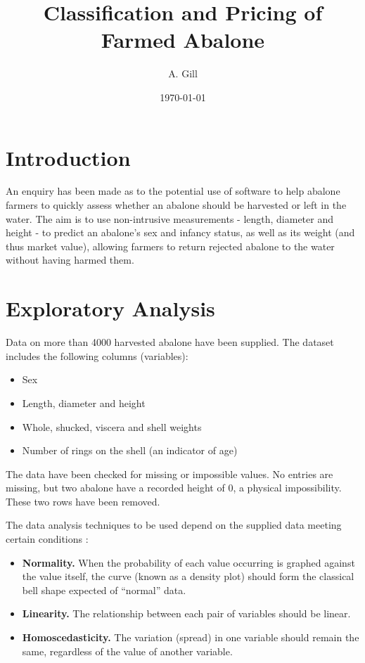 \documentclass[11pt, a4paper]{article}
\title{\Large\bfseries Classification and Pricing of Farmed Abalone}
\author{\large A. Gill}
\date{\small \today}
\begin{document}
    
    \maketitle

    \section*{Introduction}    
      
    An enquiry has been made as to the potential use of software to help abalone farmers to quickly assess whether an abalone should be harvested or left in the water. The aim is to use non-intrusive measurements - length, diameter and height - to predict an abalone's sex and infancy status, as well as its weight (and thus market value), allowing farmers to return rejected abalone to the water without having harmed them.

    \section{Exploratory Analysis}

    Data on more than 4000 harvested abalone have been supplied. The dataset includes the following columns (variables):

    \begin{itemize}
        \item Sex
        \item Length, diameter and height
        \item Whole, shucked, viscera and shell weights
        \item Number of rings on the shell (an indicator of age)
    \end{itemize}

    The data have been checked for missing or impossible values. No entries are missing, but two abalone have a recorded height of 0, a physical impossibility. These two rows have been removed.

    The data analysis techniques to be used depend on the supplied data meeting certain conditions \parencite{assumptions}:

    \begin{itemize}
        \item \textbf{Normality.} When the probability of each value occurring is graphed against the value itself, the curve (known as a density plot) should form the classical bell shape expected of ``normal'' data.
        \item \textbf{Linearity.} The relationship between each pair of variables should be linear.
        \item \textbf{Homoscedasticity.} The variation (spread) in one variable should remain the same, regardless of the value of another variable. 
    \end{itemize}
\end{document}
